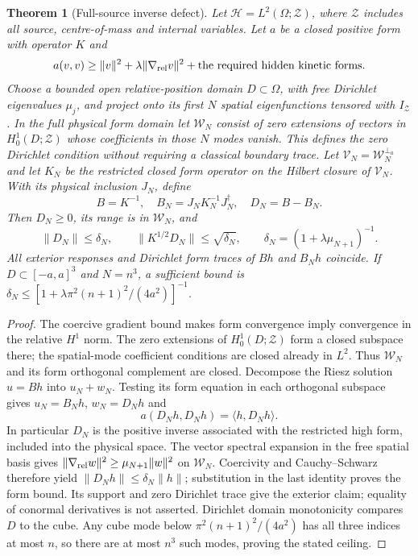 \documentclass[11pt]{article}
\numberwithin{equation}{section}
\newtheorem{theorem}{Theorem}[section]
\theoremstyle{definition}
\theoremstyle{remark}
\begin{document}
\begin{theorem}[Full-source inverse defect]
\label{p4s:thm:spatial}
Let $\mathcal H=L^2(\Omega;\mathcal Z)$, where $\mathcal Z$ includes
all source, centre-of-mass and internal variables. Let $a$ be a
closed positive form with operator $K$ and
\[
 a(v,v)\geq\|v\|^2+\lambda\|\nabla_{\rm rel}v\|^2
                 +\text{the required hidden kinetic forms}.
\]
Choose a bounded open relative-position domain $D\subset\Omega$, with
free Dirichlet eigenvalues $\mu_j$, and project onto its first $N$
spatial eigenfunctions tensored with $I_{\mathcal Z}$. In the full
physical form domain let $\mathcal W_N$ consist of zero extensions
of vectors in $H_0^1(D;\mathcal Z)$ whose coefficients in those $N$
modes vanish. This defines the zero Dirichlet condition without
requiring a classical boundary trace. Let
$\mathcal V_N=\mathcal W_N^{\perp_a}$ and let $K_N$ be the restricted
closed form operator on the Hilbert closure of $\mathcal V_N$.
With its physical inclusion $J_N$, define
\[
 B=K^{-1},\quad B_N=J_NK_N^{-1}J_N^\dagger,\quad D_N=B-B_N .
\]
Then $D_N\geq0$, its range is in $\mathcal W_N$, and
\begin{equation}\label{p4s:eq:spatial}
 \|D_N\|\leq\delta_N,\qquad
 \|K^{1/2}D_N\|\leq\sqrt{\delta_N},\qquad
 \delta_N=(1+\lambda\mu_{N+1})^{-1}.
\end{equation}
All exterior responses and Dirichlet form traces of $Bh$ and $B_Nh$
coincide. If $D\subset[-a,a]^3$ and $N=n^3$, a sufficient bound is
$\delta_N\leq[1+\lambda\pi^2(n+1)^2/(4a^2)]^{-1}$.
\end{theorem}
\begin{proof}
The coercive gradient bound makes form convergence imply convergence
in the relative $H^1$ norm. The zero extensions of
$H_0^1(D;\mathcal Z)$ form a closed subspace there; the spatial-mode
coefficient conditions are closed already in $L^2$. Thus
$\mathcal W_N$ and its form orthogonal complement are closed. Decompose the Riesz
solution $u=Bh$ into $u_N+w_N$. Testing its form equation in each
orthogonal subspace gives $u_N=B_Nh$, $w_N=D_Nh$ and
\[
 a(D_Nh,D_Nh)=\langle h,D_Nh\rangle .
\]
In particular $D_N$ is the positive inverse associated with the
restricted high form, included into the physical space. The vector
spectral expansion in the free spatial basis gives
$\|\nabla_{\rm rel}w\|^2\geq\mu_{N+1}\|w\|^2$ on $\mathcal W_N$.
Coercivity and Cauchy--Schwarz therefore yield
$\|D_Nh\|\leq\delta_N\|h\|$; substitution in the last identity
proves the form bound. Its support and zero Dirichlet trace give the
exterior claim; equality of conormal derivatives is not asserted.
Dirichlet domain monotonicity compares $D$ to the cube. Any cube
mode below $\pi^2(n+1)^2/(4a^2)$ has all three indices at most $n$,
so there are at most $n^3$ such modes, proving the stated ceiling.
\end{proof}
\end{document}
